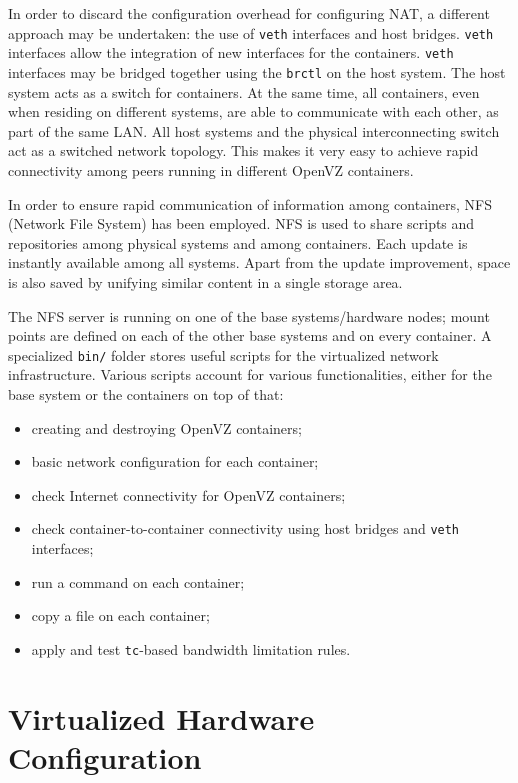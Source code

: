 In order to discard the configuration overhead for configuring NAT, a
different approach may be undertaken: the use of \texttt{veth} interfaces and
host bridges. \texttt{veth} interfaces allow the integration of new interfaces
for the containers. \texttt{veth} interfaces may be bridged together using the
\texttt{brctl} on the host system. The host system acts as a switch for
containers. At the same time, all containers, even when residing on different
systems, are able to communicate with each other, as part of the same LAN. All
host systems and the physical interconnecting switch act as a switched network
topology. This makes it very easy to achieve rapid connectivity among peers
running in different OpenVZ containers.

In order to ensure rapid communication of information among containers, NFS
(Network File System) has been employed. NFS is used to share scripts and
repositories among physical systems and among containers. Each update is
instantly available among all systems. Apart from the update improvement,
space is also saved by unifying similar content in a single storage area.

The NFS server is running on one of the base systems/hardware nodes; mount
points are defined on each of the other base systems and on every container. A
specialized \texttt{bin/} folder stores useful scripts for the virtualized
network infrastructure. Various scripts account for various functionalities,
either for the base system or the containers on top of that:

\begin{itemize}
  \item creating and destroying OpenVZ containers;
  \item basic network configuration for each container;
  \item check Internet connectivity for OpenVZ containers;
  \item check container-to-container connectivity using host bridges and
  \texttt{veth} interfaces;
  \item run a command on each container;
  \item copy a file on each container;
  \item apply and test \texttt{tc}-based bandwidth limitation rules.
\end{itemize}

\section{Virtualized Hardware Configuration}
\label{sec:virt-hwconf}

